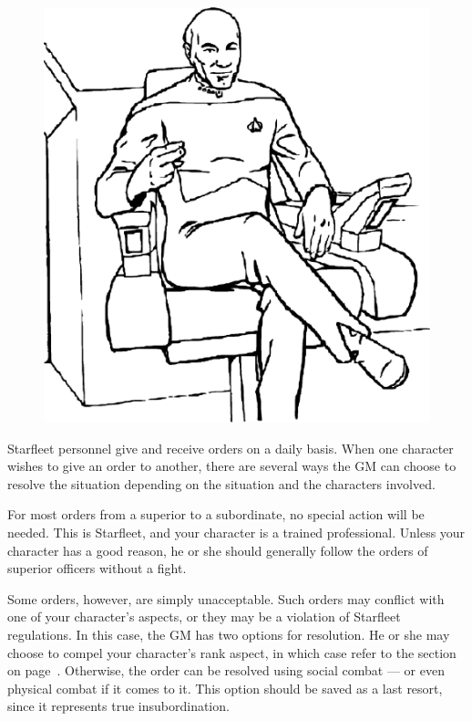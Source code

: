 \documentclass[12pt,titlepage,openany]{book}
\begin{document}
\begin{figure}
    \vspace{1ex}
    \centering
    \includegraphics[width=0.8\linewidth]{img/PicardChair.eps}\\
\end{figure}

Starfleet personnel give and receive orders on a daily basis. When one
character wishes to give an order to another, there are several ways the GM can
choose to resolve the situation depending on the situation and the characters
involved.

For most orders from a superior to a subordinate, no special action will be
needed. This is Starfleet, and your character is a trained professional.
Unless your character has a good reason, he or she should generally follow the
orders of superior officers without a fight.

Some orders, however, are simply unacceptable. Such orders may conflict with
one of your character's aspects, or they may be a violation of Starfleet
regulations. In this case, the GM has two options for resolution. He or she may
choose to compel your character's rank aspect, in which case refer to the
section  on page~\pageref{sec:aspects-orders}.
Otherwise, the order can be resolved using social combat --- or even physical
combat if it comes to it. This option should be saved as a last resort, since
it represents true insubordination.
\end{document}
